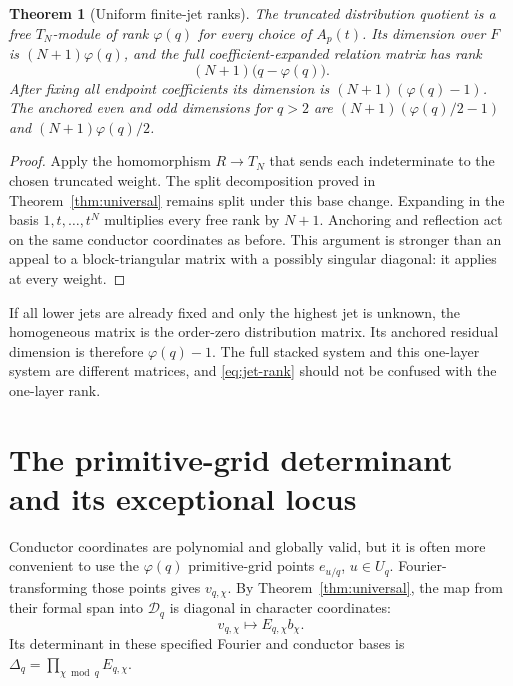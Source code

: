 \documentclass[11pt]{article}
\numberwithin{equation}{section}
\newtheorem{theorem}{Theorem}[section]
\theoremstyle{definition}
\theoremstyle{remark}
\newcommand{\D}{\mathcal D}
\begin{document}
\begin{theorem}[Uniform finite-jet ranks]\label{thm:jet-rank}
The truncated distribution quotient is a free $T_N$-module of rank
$\varphi(q)$ for every choice of $A_p(t)$. Its dimension over $F$ is
$(N+1)\varphi(q)$, and the full coefficient-expanded relation matrix
has rank
\begin{equation}\label{eq:jet-rank}
 (N+1)\bigl(q-\varphi(q)\bigr).
\end{equation}
After fixing all endpoint coefficients its dimension is
$(N+1)(\varphi(q)-1)$. The anchored even and odd dimensions for $q>2$
are $(N+1)(\varphi(q)/2-1)$ and $(N+1)\varphi(q)/2$.
\end{theorem}
\begin{proof}
Apply the homomorphism $R\to T_N$ that sends each indeterminate to the
chosen truncated weight. The split decomposition proved in
Theorem~\ref{thm:universal} remains split under this base change.
Expanding in the basis $1,t,\ldots,t^N$ multiplies every free rank by
$N+1$. Anchoring and reflection act on the same conductor coordinates
as before. This argument is stronger than an appeal to a block-triangular
matrix with a possibly singular diagonal: it applies at every weight.
\end{proof}

If all lower jets are already fixed and only the highest jet is unknown,
the homogeneous matrix is the order-zero distribution matrix. Its
anchored residual dimension is therefore $\varphi(q)-1$. The full
stacked system and this one-layer system are different matrices, and
\eqref{eq:jet-rank} should not be confused with the one-layer rank.

\section{The primitive-grid determinant and its exceptional locus}\label{sec:det}

Conductor coordinates are polynomial and globally valid, but it is often
more convenient to use the $\varphi(q)$ primitive-grid points
$e_{u/q}$, $u\in U_q$. Fourier-transforming those points gives
$v_{q,\chi}$. By Theorem~\ref{thm:universal}, the map from their formal
span into $\D_q$ is diagonal in character coordinates:
\begin{equation}\label{eq:primitive-diagonal}
 v_{q,\chi}\longmapsto E_{q,\chi}b_\chi.
\end{equation}
Its determinant in these specified Fourier and conductor bases is
$\Delta_q=\prod_{\chi\bmod q}E_{q,\chi}$.
\end{document}
